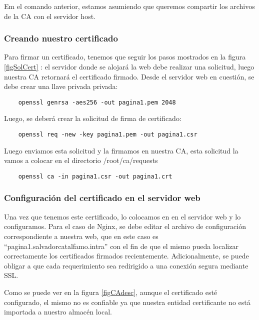 Em el comando anterior, estamos asumiendo que queremos compartir los archivos de la CA con el servidor 
host.

 



\subsubsection*{Creando nuestro certificado}

Para firmar un certificado, tenemos que seguir los pasos mostrados en la figura \ref{figSolCert}
: el servidor donde se alojará la web debe realizar una solicitud, 
luego nuestra CA retornará el certificado firmado. Desde el servidor web en cuestión, se debe 
crear una llave privada privada:

\begin{verbatim}
    openssl genrsa -aes256 -out pagina1.pem 2048
\end{verbatim}

\noindent Luego, se deberá crear la solicitud de firma de certificado:
\begin{verbatim}
    openssl req -new -key pagina1.pem -out pagina1.csr
\end{verbatim}

\noindent Luego enviamos esta solicitud y la firmamos en nuestra CA, esta solicitud la vamos a colocar 
en el directorio /root/ca/requests
\begin{verbatim}
    openssl ca -in pagina1.csr -out pagina1.crt
\end{verbatim}

\subsubsection*{Configuración del certificado en el servidor web}
Una vez que tenemos este certificado, lo colocamos en en el servidor web y 
lo configuramos. Para el caso de Nginx, se debe editar el archivo de configuración 
correspondiente a nuestra web, que en este caso es “pagina1.salvadorcatalfamo.intra”
con el fin de que el mismo pueda localizar correctamente los certificados firmados recientemente.
Adicionalmente, se puede obligar a que cada requerimiento sea redirigido a una conexión
segura mediante SSL.

Como se puede ver en la figura \ref{figCAdesc}, aunque el certificado esté configurado, 
el mismo no es confiable ya que nuestra entidad certificante no está importada a nuestro almacén 
local.

